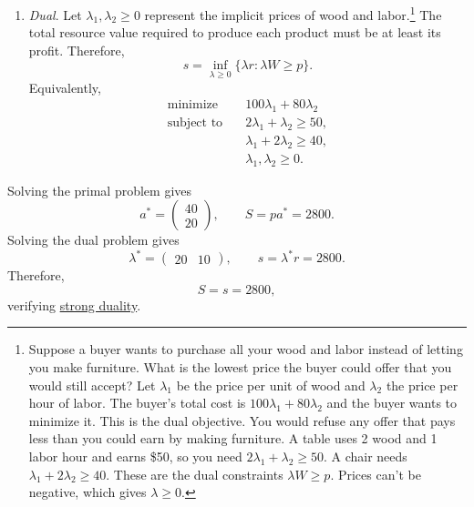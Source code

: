 \begin{example}
\begin{enumerate}
			\item \textit{Dual}. Let $\lambda_1,\lambda_2 \geq 0$ represent the implicit prices of wood and labor.\footnote{Suppose a buyer wants to purchase all your wood and labor instead of letting you make furniture. What is the lowest price the buyer could offer that you would still accept? Let $\lambda_1$ be the price per unit of wood and $\lambda_2$ the price per hour of labor. The buyer's total cost is $100 \lambda_1 + 80 \lambda_2$ and the buyer wants to minimize it. This is the dual objective. You would refuse any offer that pays less than you could earn by making furniture. A table uses 2 wood and 1 labor hour and earns \$50, so you need $2 \lambda_1 + \lambda_2 \geq 50$. A chair needs $\lambda_1 + 2\lambda_2 \geq 40$. These are the dual constraints $\lambda W \geq p$. Prices can't be negative, which gives $\lambda \geq 0$. } The total resource value required to produce each product must be at least its profit. Therefore,
				\begin{equation}
					s = \inf_{\lambda \geq 0}
					\{\lambda r \colon \lambda W \geq p\}.
				\end{equation}
				Equivalently,
				\begin{align}
					\text{minimize} \quad &100\lambda_1 + 80\lambda_2 \\
					\text{subject to} \quad
					&2\lambda_1 + \lambda_2 \geq 50, \\
					&\lambda_1 + 2\lambda_2 \geq 40, \\
					&\lambda_1,\lambda_2 \geq 0.
				\end{align}
		\end{enumerate}

		Solving the primal problem gives
		\begin{equation}
			a^* = \begin{pmatrix} 40 \\ 20 \end{pmatrix}, \qquad S = pa^* = 2800.
		\end{equation}
		Solving the dual problem gives
		\begin{equation}
			\lambda^* = \begin{pmatrix} 20 & 10 \end{pmatrix}, \qquad s = \lambda^*r = 2800.
		\end{equation}
		Therefore,
		\begin{equation}
			S = s = 2800,
		\end{equation}
		verifying \hyperref[thm:strong-duality]{strong duality}.
	\end{example}


